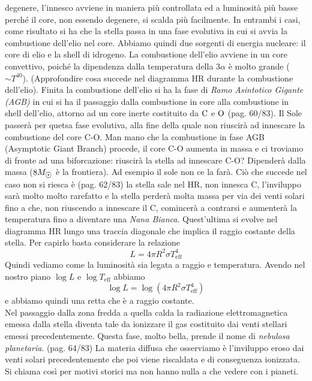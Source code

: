 degenere, l'innesco avviene in maniera più controllata ed a luminosità più basse perché il core, non essendo degenere, si scalda più facilmente. In entrambi i casi, come risultato si ha che la stella passa in una fase evolutiva in cui si avvia la combustione dell'elio nel core. Abbiamo quindi due sorgenti di energia nucleare: il core di elio e la shell di idrogeno. La combustione dell'elio avviene in un core convettivo, poiché la dipendenza dalla temperatura della $3\alpha$ è molto grande ($\sim T^{40}$). (Approfondire cosa succede nel diagramma HR durante la combustione dell'elio). Finita la combustione dell'elio si ha la fase di \textit{Ramo Asintotico Gigante (AGB)} in cui si ha il passaggio dalla combustione in core alla combustione in shell dell'elio, attorno ad un core inerte costituito da $\ce{C}$ e $\ce{O}$  (pag. 60/83). Il Sole passerà per quetsa fase evolutiva, alla fine della quale non riuscirà ad innescare la combustione del core C-O. Man mano che la combustione in fase AGB (Asymptotic Giant Branch) procede, il core C-O aumenta in massa e ci troviamo di fronte ad una biforcazione: riuscirà la stella ad innescare C-O? Dipenderà dalla massa ($8\sunmass$ è la frontiera). Ad esempio il sole non ce la farà. Ciò che succede nel caso non si riesca è (pag. 62/83) la stella sale nel HR, non innesca C, l'inviluppo sarà molto molto rarefatto e la stella perderà molta massa per via dei venti solari fino a che, non riuscendo a innescare il C, comincerà a contrarsi e aumenterà la temperatura fino a diventare una \textit{Nana Bianca}. Quest'ultima si evolve nel diagramma HR lungo una traccia diagonale che implica il raggio costante della stella. Per capirlo basta considerare la relazione 
\begin{equation*}
    L = 4\pi R^2\sigma T_{\text{eff}}^4
\end{equation*}
Quindi vediamo come la luminosità sia legata a raggio e temperatura. Avendo nel nostro piano $\log L$ e $\log T_{\text{eff}}$ abbiamo
\begin{equation*}
    \log L = \log(4\pi R^2\sigma T_{\text{eff}}^4)
\end{equation*}
e abbiamo quindi una retta che è a raggio costante. \\
Nel passaggio dalla zona fredda a quella calda la radiazione elettromagnetica emessa dalla stella diventa tale da ionizzare il gas costituito dai venti stellari emessi precedentemente. Questa fase, molto bella, prende il nome di \textit{nebulosa planetaria}. (pag. 64/83) La materia diffusa che osserviamo è l'inviluppo eroso dai venti solari precedentemente che poi viene riscaldata e di conseguenza ionizzata. Si chiama così per motivi storici ma non hanno nulla a che vedere con i pianeti.\\
